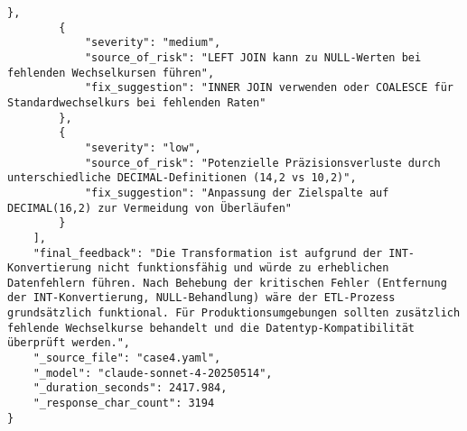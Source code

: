 \begin{lstlisting}[caption={Ausgabe: Claude Sonnet 4 Anwendungsfall 4 Robustheitsdurchlauf},label={claude_case4_prompt3}]
        },
        {
            "severity": "medium",
            "source_of_risk": "LEFT JOIN kann zu NULL-Werten bei fehlenden Wechselkursen führen",
            "fix_suggestion": "INNER JOIN verwenden oder COALESCE für Standardwechselkurs bei fehlenden Raten"
        },
        {
            "severity": "low",
            "source_of_risk": "Potenzielle Präzisionsverluste durch unterschiedliche DECIMAL-Definitionen (14,2 vs 10,2)",
            "fix_suggestion": "Anpassung der Zielspalte auf DECIMAL(16,2) zur Vermeidung von Überläufen"
        }
    ],
    "final_feedback": "Die Transformation ist aufgrund der INT-Konvertierung nicht funktionsfähig und würde zu erheblichen Datenfehlern führen. Nach Behebung der kritischen Fehler (Entfernung der INT-Konvertierung, NULL-Behandlung) wäre der ETL-Prozess grundsätzlich funktional. Für Produktionsumgebungen sollten zusätzlich fehlende Wechselkurse behandelt und die Datentyp-Kompatibilität überprüft werden.",
    "_source_file": "case4.yaml",
    "_model": "claude-sonnet-4-20250514",
    "_duration_seconds": 2417.984,
    "_response_char_count": 3194
}
\end{lstlisting}

